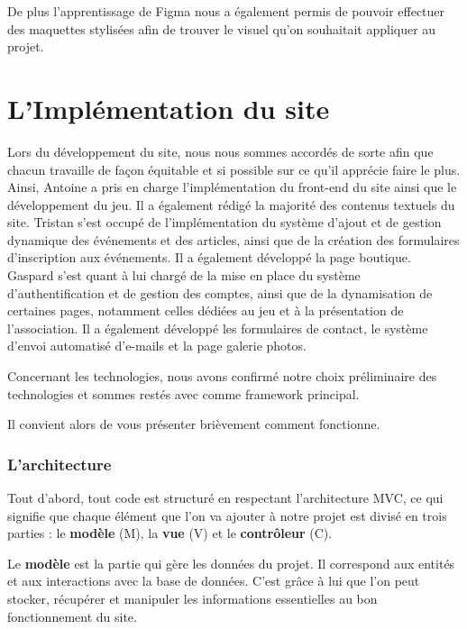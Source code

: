 De plus l'apprentissage de Figma nous a également permis de pouvoir effectuer des maquettes stylisées afin de trouver le visuel qu'on souhaitait appliquer au projet.



\section{L'Implémentation du site}

Lors du développement du site, nous nous sommes accordés de sorte afin que chacun travaille de façon équitable et si possible sur ce qu'il apprécie faire le plus. 
Ainsi, Antoine a pris en charge l’implémentation du front-end du site ainsi que le développement du jeu. Il a également rédigé la majorité des contenus textuels du site.  
Tristan s’est occupé de l’implémentation du système d’ajout et de gestion dynamique des événements et des articles, ainsi que de la création des formulaires d’inscription aux événements. Il a également développé la page boutique.
Gaspard s’est quant à lui chargé de la mise en place du système d’authentification et de gestion des comptes, ainsi que de la dynamisation de certaines pages, notamment celles dédiées au jeu et à la présentation de l’association. Il a également développé les formulaires de contact, le système d’envoi automatisé d’e-mails et la page galerie photos.

Concernant les technologies, nous avons confirmé notre choix préliminaire des technologies et sommes restés avec  comme framework principal.

Il convient alors de vous présenter brièvement comment  fonctionne.

\subsubsection*{L'architecture }

Tout d'abord, tout code  est structuré en respectant l'architecture MVC, ce qui signifie que chaque élément que l'on va ajouter à notre projet est divisé en trois parties : le \textbf{modèle} (M), la \textbf{vue} (V) et le \textbf{contrôleur} (C). 

Le \textbf{modèle} est la partie qui gère les données du projet. Il correspond aux entités et aux interactions avec la base de données. C’est grâce à lui que l’on peut stocker, récupérer et manipuler les informations essentielles au bon fonctionnement du site.

